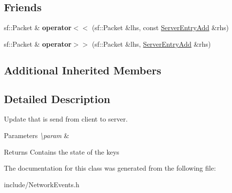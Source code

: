 \subsection*{Friends}
\begin{DoxyCompactItemize}
\item 
\hypertarget{class_server_entry_add_ad7f9e52ca2a1e66099a0a8e7bf14bb67}{sf\-::\-Packet \& {\bfseries operator$<$$<$} (sf\-::\-Packet \&lhs, const \hyperlink{class_server_entry_add}{Server\-Entry\-Add} \&rhs)}\label{class_server_entry_add_ad7f9e52ca2a1e66099a0a8e7bf14bb67}

\item 
\hypertarget{class_server_entry_add_ab30669e1b81d46a6c3013b8276591a9a}{sf\-::\-Packet \& {\bfseries operator$>$$>$} (sf\-::\-Packet \&lhs, \hyperlink{class_server_entry_add}{Server\-Entry\-Add} \&rhs)}\label{class_server_entry_add_ab30669e1b81d46a6c3013b8276591a9a}

\end{DoxyCompactItemize}
\subsection*{Additional Inherited Members}


\subsection{Detailed Description}
Update that is send from client to server. 


\begin{DoxyParams}{Parameters}
{\em \textbackslash{}param} & \\
\hline
\end{DoxyParams}
\begin{DoxyReturn}{Returns}
Contains the state of the keys 
\end{DoxyReturn}


The documentation for this class was generated from the following file\-:\begin{DoxyCompactItemize}
\item 
include/Network\-Events.\-h\end{DoxyCompactItemize}
